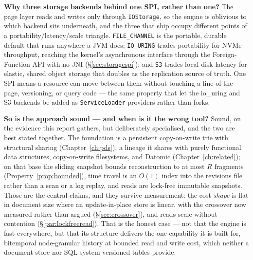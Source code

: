 \documentclass[11pt,a4paper,oneside]{report}
\theoremstyle{sirixthm}
\newcommand{\code}[1]{\texttt{#1}}
\begin{document}
\textbf{Why three storage backends behind one SPI, rather than one?} The page layer reads and writes only
through \code{IOStorage}, so the engine is oblivious to which backend sits underneath, and the three that
ship occupy different points of a portability/latency/scale triangle. \code{FILE\_CHANNEL} is the portable,
durable default that runs anywhere a JVM does; \code{IO\_URING} trades portability for NVMe throughput,
reaching the kernel's asynchronous interface through the Foreign-Function API with no JNI
(\S\ref{sec:storagespi}); and \code{S3} trades local-disk latency for elastic, shared object storage that
doubles as the replication source of truth. One SPI means a resource can move between them without touching
a line of the page, versioning, or query code --- the same property that let the io\_uring and S3 backends
be added as \code{ServiceLoader} providers rather than forks.

\textbf{So is the approach sound --- and when is it the wrong tool?} Sound, on the evidence this report
gathers, but deliberately specialised, and the two are best stated together. The foundation is a
persistent copy-on-write trie with structural sharing (Chapter~\ref{ch:pds}), a lineage it shares with
purely functional data structures, copy-on-write filesystems, and Datomic (Chapter~\ref{ch:related}); on
that base the sliding snapshot bounds reconstruction to at most $R$ fragments
(Property~\ref{prop:bounded}), time travel is an $O(1)$ index into the revisions file rather than a scan or
a log replay, and reads are lock-free immutable snapshots. Those are the central claims, and they survive
measurement: the cost \emph{shape} is flat in document size where an update-in-place store is linear, with
the crossover now measured rather than argued (\S\ref{sec:crossover}), and reads scale without contention
(\S\ref{par:lockfreeread}). That is the honest case --- not that the engine is fast everywhere, but that
its structure delivers the one capability it is built for, bitemporal node-granular history at bounded read
and write cost, which neither a document store nor SQL system-versioned tables provide.
\end{document}
